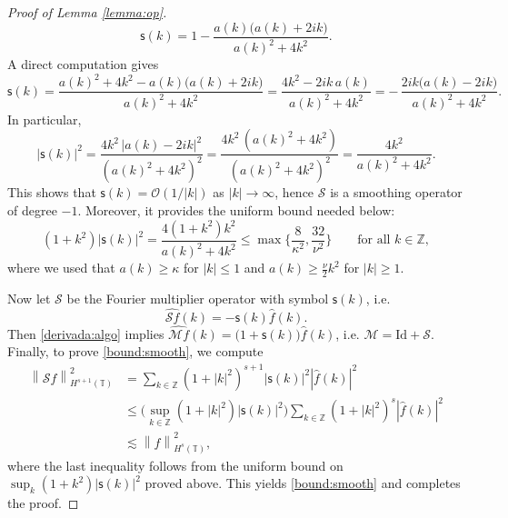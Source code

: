 \documentclass[reqno]{amsart}
\newcommand{\ZZ}{\mathbb Z}
\newcommand{\Id}{\mathrm{Id}}
\newcommand{\norm}[1]{\left\lVert#1\right\rVert}
\theoremstyle{definition}
\numberwithin{equation}{section}
\numberwithin{theorem}{section}
\numberwithin{definition}{section}
\begin{document}
\begin{proof}[Proof of Lemma \ref{lemma:op}]
\begin{equation}
\mathsf{s}(k)=1-\frac{a(k)\big(a(k)+2ik\big)}{a(k)^2+4k^2}.
\end{equation}
A direct computation gives
\[
\mathsf{s}(k)=\frac{a(k)^2+4k^2-a(k)\big(a(k)+2ik\big)}{a(k)^2+4k^2}
=\frac{4k^2-2ik\,a(k)}{a(k)^2+4k^2}
=-\,\frac{2ik\big(a(k)-2ik\big)}{a(k)^2+4k^2}.
\]
In particular,
\[
|\mathsf{s}(k)|^{2}
=\frac{4k^{2}\,|a(k)-2ik|^{2}}{(a(k)^{2}+4k^{2})^{2}}
=\frac{4k^{2}\,(a(k)^{2}+4k^{2})}{(a(k)^{2}+4k^{2})^{2}}
=\frac{4k^{2}}{a(k)^{2}+4k^{2}}.
\]
This shows that $\mathsf{s}(k)=\mathcal{O}(1/|k|)$ as $|k|\to\infty$, hence $\mathcal{S}$ is a smoothing
operator of degree $-1$. Moreover, it provides the uniform bound needed below:
\[
(1+k^{2})|\mathsf{s}(k)|^{2}=\frac{4(1+k^{2})k^{2}}{a(k)^{2}+4k^{2}}
\le \max\Big\{\frac{8}{\kappa^{2}},\frac{32}{\nu^{2}}\Big\}
\qquad\text{for all }k\in\ZZ,
\]
where we used that $a(k)\ge \kappa$ for $|k|\le 1$ and $a(k)\ge \frac{\nu}{2}k^{2}$ for $|k|\ge 1$. \medskip

Now let $\mathcal{S}$ be the Fourier multiplier operator with symbol $\mathsf{s}(k)$, i.e.
\[
\widehat{\mathcal{S}f}(k)=-\mathsf{s}(k)\widehat f(k).
\]
Then \eqref{derivada:algo} implies $\widehat{\mathcal{M}f}(k)=\big(1+\mathsf{s}(k)\big)\widehat f(k)$, i.e. $\mathcal{M}=\Id+\mathcal{S}.$ Finally, to prove \eqref{bound:smooth}, we compute
\begin{align*}
\norm{\mathcal{S}f}^{2}_{H^{s+1}(\mathbb{T})}
&=\sum_{k\in\mathbb{Z}}  \left(1+|k|^{2}\right)^{s+1} |\mathsf{s}(k)|^{2}|\widehat{f}(k)|^{2}\\
&\le \Big(\sup_{k\in\mathbb{Z}} (1+|k|^{2}) |\mathsf{s}(k)|^{2}\Big)
\sum_{k\in\mathbb{Z}}  \left(1+|k|^{2}\right)^{s} |\widehat{f}(k)|^{2}\\
&\lesssim \norm{f}_{H^{s}(\mathbb{T})}^{2},
\end{align*}
where the last inequality follows from the uniform bound on
$\sup_k (1+k^2)|\mathsf{s}(k)|^2$ proved above. This yields \eqref{bound:smooth} and completes the proof.
\end{proof}
\end{document}

